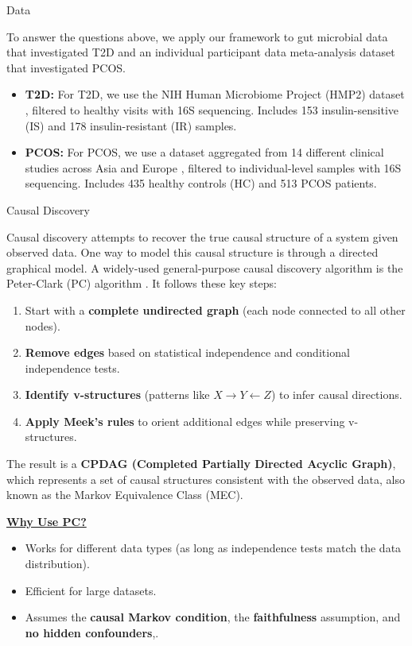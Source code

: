 \documentclass[final]{beamer}
\newlength{\colwidth}
\begin{document}
\begin{frame}[t]
\begin{columns}[t]
\begin{column}{\colwidth}
  \begin{block}{Data}

    To answer the questions above, we apply our framework to gut microbial data that investigated T2D and 
    an individual participant data meta-analysis dataset that investigated PCOS. 
    
    \begin{itemize}
      \item \textbf{T2D:} For T2D, we use the NIH Human Microbiome Project (HMP2) dataset \cite{zhou2019t2d}, filtered to healthy visits with 16S sequencing. Includes 153 insulin-sensitive (IS) and 178 insulin-resistant (IR) samples.
      \item \textbf{PCOS:} For PCOS, we use a dataset aggregated from 14 different clinical studies across Asia and Europe \cite{yang2024pcos}, filtered to individual-level samples with 16S sequencing. Includes 435 healthy controls (HC) and 513 PCOS patients.
    \end{itemize}

  \end{block}
  
	  \begin{alertblock}{Causal Discovery}
	  
	  	Causal discovery attempts to recover the true causal structure of a system given observed data. One way to model this causal structure is through a directed graphical model. A widely-used general-purpose causal discovery algorithm is the Peter-Clark (PC) algorithm \cite{glymour2019review}. It follows these key steps:
		\begin{enumerate}
		    \item Start with a \textbf{complete undirected graph} (each node connected to all other nodes).
		    \item \textbf{Remove edges} based on statistical independence and conditional independence tests.
		    \item \textbf{Identify v-structures} (patterns like $X \to Y \leftarrow Z$) to infer causal directions.
		    \item \textbf{Apply Meek’s rules} to orient additional edges while preserving v-structures.
		\end{enumerate}

	The result is a \textbf{CPDAG (Completed Partially Directed Acyclic Graph)}, which represents a set of causal structures consistent with the observed data, also known as the Markov Equivalence Class (MEC). 

	\textbf{\underline{Why Use PC?}}
			\begin{itemize}
			    \item Works for different data types (as long as independence tests match the data distribution).
			    \item Efficient for large datasets.
			    \item Assumes the \textbf{causal Markov condition}, the \textbf{faithfulness} assumption, and \textbf{no hidden confounders},.
			\end{itemize}
	  

\end{alertblock}
\end{column}
\end{columns}
\end{frame}
\end{document}
